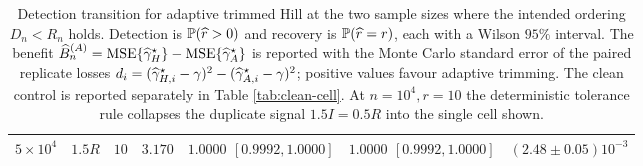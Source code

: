 \begin{table}[t]
\begin{tabular}{ccccccc}
$5{\times}10^4$ & $1.5R$ & $10$ & $3.170$ & $1.0000$ $[0.9992,1.0000]$ & $1.0000$ $[0.9992,1.0000]$ & $(2.48\pm0.05)10^{-3}$\\
\bottomrule
\end{tabular}
\caption{Detection transition for adaptive trimmed Hill at the two sample sizes where the intended ordering $D_n<R_n$ holds.  Detection is $\mathbb{P}(\widehat r>0)$ and recovery is $\mathbb{P}(\widehat r=r)$, each with a Wilson $95\%$ interval.  The benefit $\widehat B_n^{(A)}=\operatorname{MSE}\{\widehat{\gamma}_H^\star\}-\operatorname{MSE}\{\widehat{\gamma}_A^\star\}$ is reported with the Monte Carlo standard error of the paired replicate losses $d_i=(\widehat{\gamma}_{H,i}^\star-\gamma)^2-(\widehat{\gamma}_{A,i}^\star-\gamma)^2$; positive values favour adaptive trimming.  The clean control is reported separately in Table \ref{tab:clean-cell}.  At $n=10^4,r=10$ the deterministic tolerance rule collapses the duplicate signal $1.5I=0.5R$ into the single cell shown.}
\label{tab:first-run-adaptive}
\end{table}
